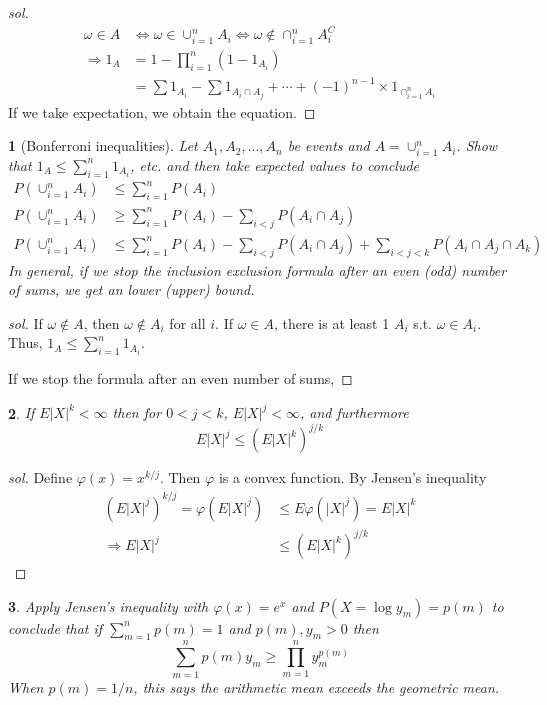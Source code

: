 \documentclass{report}
\newtheorem{ex}{}[section]
\begin{document}
\begin{proof}[sol]
\begin{align*}
    \omega \in A &\Leftrightarrow \omega \in \cup_{i=1}^n A_i \Leftrightarrow \omega \not\in \cap_{i=1}^n A_i^C\\
    \Rightarrow 1_A &= 1 - \prod_{i=1}^n(1 - 1_{A_i}) \\
    &= \sum 1_{A_i} - \sum 1_{A_i\cap A_j}+ \dotsb + (-1)^{n-1} \times 1_{\cap_{i=1}^n A_i}
\end{align*}
If we take expectation, we obtain the equation.
\end{proof}
\begin{ex}[Bonferroni inequalities] Let $A_1,A_2,...,A_n$ be events and $A = \cup_{i=1}^n A_i$. Show that $1_A \le \sum_{i=1}^n 1_{A_i}$, etc. and then take expected values to conclude
\begin{align*}
    P(\cup_{i=1}^n A_i) & \le \sum_{i=1}^n P(A_i)\\
    P(\cup_{i=1}^n A_i) & \ge \sum_{i=1}^n P(A_i) - \sum_{i < j}P(A_i \cap A_j)\\
    P(\cup_{i=1}^n A_i) & \le \sum_{i=1}^n P(A_i) - \sum_{i < j}P(A_i \cap A_j) + \sum_{i < j < k}P(A_i \cap A_j\cap A_k)
\end{align*}
In general, if we stop the inclusion exclusion formula after an even (odd) number of sums, we get an lower (upper) bound.
\end{ex}
\begin{proof}[sol]
If $\omega \not\in A$, then $\omega \not\in A_i$ for all $i$. If $\omega \in A$, there is at least 1 $A_i$ s.t. $\omega \in A_i$. Thus, $1_A \le \sum_{i=1}^n 1_{A_i}$.

If we stop the formula after an even number of sums, 
\end{proof}
\begin{ex}
If $E|X|^k < \infty$ then for $0 < j < k$, $E|X|^j < \infty$, and furthermore
\[E|X|^j \le (E|X|^k)^{j/k}\]
\end{ex}
\begin{proof}[sol]
Define $\varphi(x) = x ^{k/j}$. Then $\varphi$ is a convex function. By Jensen's inequality
\begin{align*}
    (E|X|^j)^{k/j} = \varphi(E|X|^j) &\le E\varphi(|X|^j) = E|X|^k\\
    \Rightarrow E|X|^j &\le (E|X|^k)^{j/k}
\end{align*}
\end{proof}
\begin{ex}
Apply Jensen's inequality with $\varphi(x) = e^x$ and $P(X = \log y_m) = p(m)$ to conclude that if $\sum_{m=1}^n p(m) = 1$ and $p(m), y_m > 0$ then
\[\sum_{m=1}^n p(m)y_m \ge \prod_{m=1}^n y_m^{p(m)}\]
When $p(m) = 1/n$, this says the arithmetic mean exceeds the geometric mean.
\end{ex}
\end{document}
